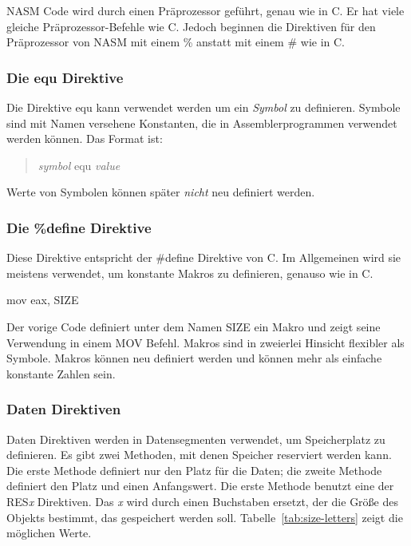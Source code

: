 NASM  Code wird durch einen
Pr\"{a}prozessor gef\"{u}hrt, genau wie in C\@. Er hat viele gleiche
Pr\"{a}prozessor-Befehle wie C\@. Jedoch beginnen die Direktiven f\"{u}r den
Pr\"{a}prozessor von NASM mit einem \% anstatt mit einem \# wie in C\@.

\subsubsection{Die equ Direktive}

Die Direktive {\code equ} kann verwendet werden um ein \emph{Symbol}
zu definieren. Symbole sind mit Namen versehene Konstanten, die in
Assemblerprogrammen verwendet werden k\"{o}nnen. Das Format ist:
\begin{quote}
  \code \emph{symbol} equ \emph{value}
\end{quote}
Werte von Symbolen k\"{o}nnen sp\"{a}ter \emph{nicht} neu definiert werden.

\subsubsection{Die \%define Direktive}

Diese Direktive entspricht der {\code \#define} Direktive von C. Im
Allgemeinen wird sie meistens verwendet, um konstante Makros zu
definieren, genauso wie in C\@.
\begin{AsmCodeListing}[frame=none, numbers=none]
      mov    eax, SIZE
\end{AsmCodeListing}
Der vorige Code definiert unter dem Namen {\code SIZE} ein Makro und
zeigt seine Verwendung in einem {\code MOV} Befehl. Makros sind in
zweierlei Hinsicht flexibler als Symbole. Makros k\"{o}nnen neu
definiert werden und k\"{o}nnen mehr als einfache konstante Zahlen sein.

\subsubsection{Daten Direktiven}

Daten Direktiven werden in Datensegmenten verwendet, um
Speicherplatz zu definieren. Es gibt zwei Methoden, mit denen
Speicher reserviert werden kann. Die erste Methode definiert nur den
Platz f\"{u}r die Daten; die zweite Methode definiert den Platz und
einen Anfangswert. Die erste Methode benutzt eine der {\code
RES\emph{x}}  Direktiven. Das {\em x}
wird durch einen Buchstaben ersetzt, der die Gr\"{o}{\ss}e des Objekts
bestimmt, das gespeichert werden soll.
Tabelle~\ref{tab:size-letters} zeigt die m\"{o}glichen Werte.

